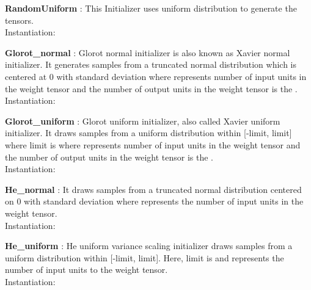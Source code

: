 \textbf{RandomUniform} : This Initializer uses uniform distribution to generate the tensors.\\
Instantiation: \\

\textbf{Glorot\_normal} : Glorot normal initializer is also known as Xavier normal initializer. It generates samples from a truncated normal distribution which is centered at 0 with  
standard deviation  where  represents number of input units in the weight tensor and the number of output units in the weight tensor is the .\\
Instantiation: 

\textbf{Glorot\_uniform} : Glorot uniform initializer, also called Xavier uniform initializer. It draws samples from a uniform distribution within [-limit, limit] 
where limit is  where  represents number of input units in the weight tensor and the number of output units in the weight tensor is the .\\
Instantiation: 

\textbf{He\_normal} : It draws samples from a truncated normal distribution centered on 0 with standard deviation  where   represents the number of 
input units in the weight tensor.\\
Instantiation: 

\textbf{He\_uniform} : He uniform variance scaling initializer draws samples from a uniform distribution within [-limit, limit]. Here, limit is  and  represents the number
of input units to the weight tensor.\\
Instantiation: 

